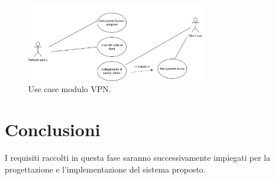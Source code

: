 \begin{figure}[h] \includegraphics[width=0.7\textwidth] {Tesi magistrale/capitoli/images/use case 2.png}
\centering
\caption{Use case modulo VPN.}
\end{figure}

\section{Conclusioni}
I requisiti raccolti in questa fase saranno successivamente impiegati per la progettazione e l'implementazione del sistema proposto.

